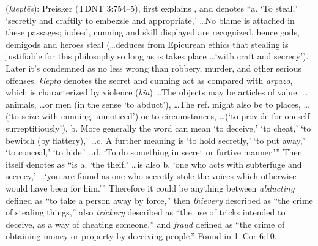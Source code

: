 \item[Fraudster,]

(\textit{kleptēs}):
Preisker (TDNT 3:754--5), first explains , and denotes ``a. `To steal,' `secretly and craftily to embezzle and appropriate,' \ldots No blame is attached in these passages; indeed, cunning and skill displayed are recognized, hence gods, demigods and heroes steal (\ldots deduces from Epicurean ethics that stealing is justifiable for this philosophy so long as is takes place \ldots `with craft and secrecy'). Later it's condemned as no less wrong than robbery, murder, and other serious offenses. \emph{klepto} denotes the secret and cunning act as compared with \emph{arpazo}, which is characterized by violence (\emph{bia}) \ldots The objects may be articles of value, \ldots animals, \ldots or men (in the sense `to abduct'), \ldots The ref. might also be to places, \ldots (`to seize with cunning, unnoticed') or to circumstances, \ldots (`to provide for oneself surreptitiously'). b. More generally the word can mean `to deceive,' `to cheat,' `to bewitch (by flattery),' \ldots c. A further meaning is `to hold secretly,' `to put away,' `to conceal,' `to hide.' \ldots d. `To do something in secret or furtive manner.''' Then  itself denotes as ``is a. `the theif,' \ldots is also b. `one who acts with subterfuge and secrecy,' \ldots `you are found as one who secretly stole the voices which otherwise would have been for him.''' Therefore it could be anything between \emph{abducting} defined as ``to take a person away by force,'' then \emph{thievery} described as ``the crime of stealing things,'' also \emph{trickery} described as ``the use of tricks intended to deceive, as a way of cheating someone,'' and \emph{fraud} defined as ``the crime of obtaining money or property by deceiving people.''
Found in 1~Cor 6:10.
